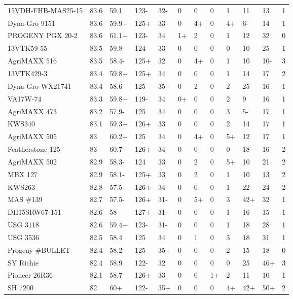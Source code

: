 \documentclass[12pt, letterpaper]{article}
\begin{document}
\begin{landscape}
\begin{ThreePartTable}
\begin{longtable}{llllllllllll}
  15VDH-FHB-MAS25-15 & 83.6 & 59.1 & 123- & 32- & 0 & 0 & 0 & 1 & 11 & 13 & 1 \\ 
  Dyna-Gro 9151 & 83.6 & 59.9+ & 125+ & 33 & 0 & 4+ & 0 & 4+ & 6- & 14 & 1 \\ 
  PROGENY PGX 20-2 & 83.6 & 61.1+ & 123- & 34 & 1+ & 2 & 0 & 1 & 12 & 32 & 0 \\ 
  13VTK59-55 & 83.5 & 59.8+ & 124 & 33 & 0 & 0 & 0 & 0 & 10 & 25 & 1 \\ 
  AgriMAXX 516 & 83.5 & 58.4- & 125+ & 32 & 0 & 4+ & 0 & 1 & 10 & 10- & 3 \\ 
  13VTK429-3 & 83.4 & 59.8+ & 125+ & 34 & 0 & 0 & 0 & 1 & 14 & 17 & 2 \\ 
  Dyna-Gro WX21741 & 83.4 & 58.6 & 125 & 35+ & 0 & 2 & 0 & 2 & 25 & 16 & 1 \\ 
  VA17W-74 & 83.3 & 59.8+ & 119- & 34 & 0+ & 0 & 0 & 2 & 9 & 16 & 1 \\ 
  AgriMAXX 473 & 83.2 & 57.9- & 125 & 34 & 0 & 0 & 0 & 3 & 5- & 17 & 1 \\ 
  KWS340 & 83.1 & 59.3+ & 126+ & 33 & 0 & 0 & 0 & 2 & 14 & 17 & 1 \\ 
  AgriMAXX 505 & 83 & 60.2+ & 125 & 34 & 0 & 4+ & 0 & 5+ & 12 & 17 & 1 \\ 
  Featherstone 125 & 83 & 60.7+ & 126+ & 34 & 0 & 0 & 0 & 0 & 18 & 16 & 2 \\ 
  AgriMAXX 502 & 82.9 & 58.3- & 124 & 33 & 0 & 2 & 0 & 5+ & 10 & 21 & 2 \\ 
  MBX 127 & 82.9 & 58.1- & 125+ & 33 & 0 & 2 & 0 & 1 & 10 & 13 & 2 \\ 
  KWS263 & 82.8 & 57.5- & 126+ & 34 & 0 & 0 & 0 & 1 & 22 & 24 & 2 \\ 
  MAS \#139 & 82.7 & 57.5- & 126+ & 31- & 0 & 5+ & 0 & 3 & 42+ & 32 & 1 \\ 
  DH15SRW67-151 & 82.6 & 58- & 127+ & 31- & 0 & 0 & 0 & 1 & 16 & 15 & 1 \\ 
  USG 3118 & 82.6 & 59.4+ & 123- & 31- & 0 & 0 & 0 & 1 & 18 & 28 & 1 \\ 
  USG 3536 & 82.5 & 58.4 & 125 & 34 & 0 & 1 & 0 & 3 & 18 & 31 & 1 \\ 
  Progeny \#BULLET & 82.4 & 58.2- & 125 & 35+ & 0 & 0 & 0 & 2 & 15 & 18 & 0 \\ 
  SY Richie & 82.4 & 58.9 & 122- & 32 & 0 & 0 & 0 & 0 & 25 & 46+ & 3 \\ 
  Pioneer 26R36 & 82.1 & 58.7 & 126+ & 33 & 0 & 0 & 1+ & 2 & 11 & 10- & 1 \\ 
  SH 7200 & 82 & 60+ & 122- & 35+ & 0 & 0 & 0 & 4+ & 42+ & 50+ & 2 \\ 

\end{longtable}
\end{ThreePartTable}
\end{landscape}
\end{document}
